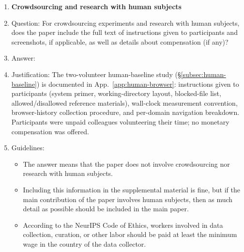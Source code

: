 \begin{enumerate}
\item {\bf Crowdsourcing and research with human subjects}
    \item[] Question: For crowdsourcing experiments and research with human subjects, does the paper include the full text of instructions given to participants and screenshots, if applicable, as well as details about compensation (if any)?
    \item[] Answer: \answerYes{}
    \item[] Justification: The two-volunteer human-baseline study (\S\ref{subsec:human-baseline}) is documented in App.~\ref{app:human-browser}: instructions given to participants (system primer, working-directory layout, blocked-file list, allowed/disallowed reference materials), wall-clock measurement convention, browser-history collection procedure, and per-domain navigation breakdown. Participants were unpaid colleagues volunteering their time; no monetary compensation was offered.
    \item[] Guidelines:
    \begin{itemize}
        \item The answer \answerNA{} means that the paper does not involve crowdsourcing nor research with human subjects.
        \item Including this information in the supplemental material is fine, but if the main contribution of the paper involves human subjects, then as much detail as possible should be included in the main paper.
        \item According to the NeurIPS Code of Ethics, workers involved in data collection, curation, or other labor should be paid at least the minimum wage in the country of the data collector.
    \end{itemize}


\end{enumerate}
